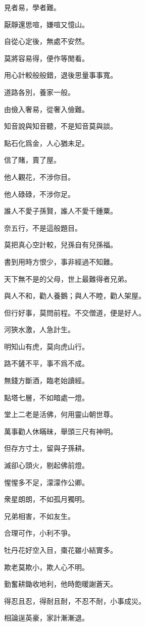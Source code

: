 \documentclass[12pt,a4paper]{ctexbook}
\begin{document}
見者易，學者難。\par
厭靜還思喧，嫌喧又憶山。\par
自從心定後，無處不安然。\par
莫將容易得，便作等閒看。\par
用心計較般般錯，退後思量事事寬。\par
道路各別，養家一般。\par
由儉入奢易，從奢入儉難。\par
知音說與知音聽，不是知音莫與談。\par
點石化爲金，人心猶未足。\par
信了賭，賣了屋。\par
他人觀花，不涉你目。\par
他人碌碌，不涉你足。\par
誰人不愛子孫賢，誰人不愛千鍾粟。\par
奈五行，不是這般題目。\par
莫把真心空計較，兒孫自有兒孫福。\par
書到用時方恨少，事非經過不知難。\par
天下無不是的父母，世上最難得者兄弟。\par
與人不和，勸人養鵝；與人不睦，勸人架屋。\par
但行好事，莫問前程。不交僧道，便是好人。\par
河狹水激，人急計生。\par
明知山有虎，莫向虎山行。\par
路不鏟不平，事不爲不成。\par
無錢方斷酒，臨老始讀經。\par
點塔七層，不如暗處一燈。\par
堂上二老是活佛，何用靈山朝世尊。\par
萬事勸人休瞞昧，舉頭三尺有神明。\par
但存方寸土，留與子孫耕。\par
滅卻心頭火，剔起佛前燈。\par
惺惺多不足，濛濛作公卿。\par
衆星朗朗，不如孤月獨明。\par
兄弟相害，不如友生。\par
合理可作，小利不爭。\par
牡丹花好空入目，棗花雖小結實多。\par
欺老莫欺小，欺人心不明。\par
勤奮耕鋤收地利，他時飽暖謝蒼天。\par
得忍且忍，得耐且耐，不忍不耐，小事成災。\par
相論逞英豪，家計漸漸退。\par
\end{document}
